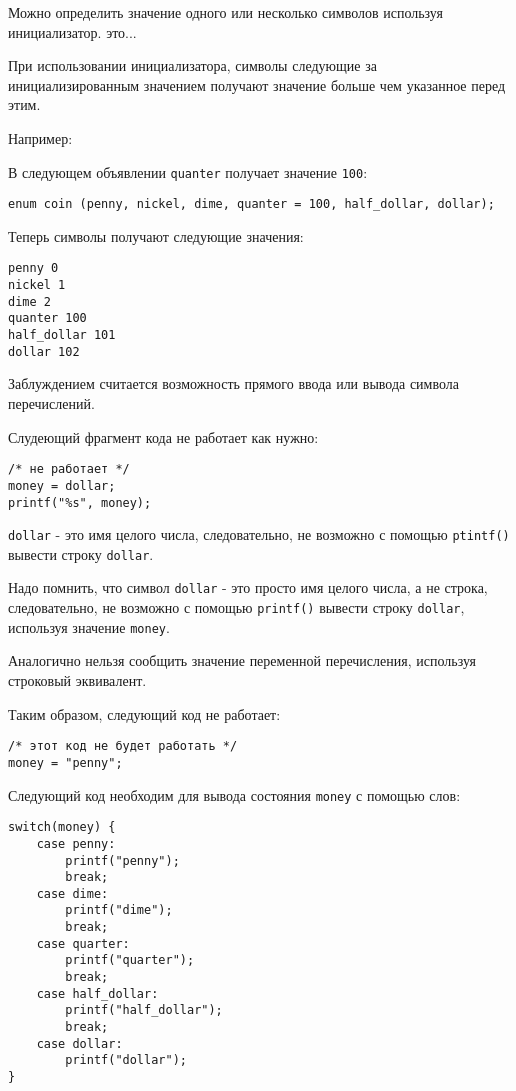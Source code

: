 Можно определить значение одного или несколько символов используя инициализатор. это...

При использовании инициализатора, символы следующие за инициализированным значением получают значение больше чем указанное перед этим.

Например:

В следующем объявлении \texttt{quanter} получает значение \texttt{100}:

\begin{verbatim}
enum coin (penny, nickel, dime, quanter = 100, half_dollar, dollar);
\end{verbatim}

Теперь символы получают следующие значения:

\begin{verbatim}
penny 0
nickel 1
dime 2
quanter 100
half_dollar 101
dollar 102
\end{verbatim}

Заблуждением считается возможность прямого ввода или вывода символа перечислений.

Слудеющий фрагмент кода не работает как нужно:

\begin {verbatim}
/* не работает */
money = dollar;
printf("%
\end{verbatim}

\texttt{dollar} - это имя целого числа, следовательно, не возможно с помощью \texttt{ptintf()} вывести строку \texttt{dollar}.

Надо помнить, что символ \texttt{dollar} - это просто имя целого числа, а не строка, следовательно, не возможно с помощью \texttt{printf()} вывести строку \texttt{dollar}, используя значение \texttt{money}.

Аналогично нельзя сообщить значение переменной перечисления, используя строковый эквивалент.

Таким образом, следующий код не работает:

\begin{verbatim}
/* этот код не будет работать */
money = "penny";
\end{verbatim}

Следующий код необходим для вывода состояния \texttt{money} с помощью слов:

\begin{verbatim}
switch(money) {
    case penny:
        printf("penny");
        break;
    case dime:
        printf("dime");
        break;
    case quarter:
        printf("quarter");
        break;
    case half_dollar:
        printf("half_dollar");
        break;
    case dollar:
        printf("dollar");
}
\end{verbatim}